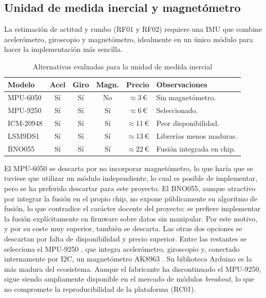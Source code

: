 \subsection{Unidad de medida inercial y magnetómetro}
\label{sec:sel_imu}

La estimación de actitud y rumbo (RF01 y RF02) requiere una IMU que combine acelerómetro, giroscopio y magnetómetro, idealmente en un único módulo para hacer la implementación más sencilla.

\begin{table}[H]
    \centering
    \caption{Alternativas evaluadas para la unidad de medida inercial}
    \label{tab:sel_imu}
    \footnotesize
    \begin{tabularx}{\linewidth}{l c c c c X}
        \toprule
        \textbf{Modelo} & \textbf{Acel} & \textbf{Giro} & \textbf{Magn.} & \textbf{Precio} & \textbf{Observaciones} \\
        \midrule
        MPU-6050   & Sí & Sí & No & $\approx$3\,\euro{}  & Sin magnetómetro. \\
        MPU-9250   & Sí & Sí & Sí & $\approx$6\,\euro{}  & Seleccionado. \\
        ICM-20948  & Sí & Sí & Sí & $\approx$11\,\euro{} & Peor disponibilidad. \\
        LSM9DS1    & Sí & Sí & Sí & $\approx$13\,\euro{} & Librerías menos maduras. \\
        BNO055     & Sí & Sí & Sí & $\approx$22\,\euro{} & Fusión integrada en chip. \\
        \bottomrule
    \end{tabularx}
\end{table}

El MPU-6050 se descarta por no incorporar magnetómetro, lo que haría que se tuviese que utilizar un módulo independiente, lo cual es posible de implementar, pero se ha preferido descartar para este proyecto. El BNO055, aunque atractivo por integrar la fusión en el propio chip, no expone públicamente su algoritmo de fusión, lo que contradice el carácter docente del proyecto: se prefiere implementar la fusión explícitamente en firmware sobre datos sin manipular. Por este motivo, y por su coste muy superior, también se descarta. Las otras dos opciones se descartan por falta de disponibilidad y precio superior. Entre las restantes se selecciona el MPU-9250 \cite{ps_mpu9250}, que integra acelerómetro, giroscopio y,
conectado internamente por I2C, un magnetómetro AK8963 \cite{ds_ak8963}. Su biblioteca Arduino \cite{kriswiner_mpu9250} es la más madura del ecosistema. Aunque el fabricante ha discontinuado el MPU-9250, sigue siendo ampliamente disponible en el mercado de módulos \textit{breakout}, lo que no compromete la reproducibilidad de la plataforma (RC01).


